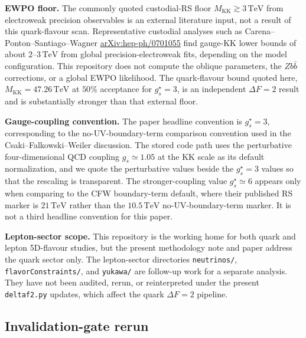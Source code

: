 \documentclass[11pt]{article}
\newcommand{\Mkk}{M_{\mathrm{KK}}}
\newcommand{\gs}{g_s^{\star}}
\begin{document}
\textbf{EWPO floor.}  The commonly quoted custodial-RS floor
$\Mkk \gtrsim 3\,\mathrm{TeV}$ from electroweak precision observables is
an external literature input, not a result of this quark-flavour scan.
Representative custodial analyses such as
Carena--Ponton--Santiago--Wagner
\href{https://arxiv.org/abs/hep-ph/0701055}{arXiv:hep-ph/0701055}
find gauge-KK lower bounds of about $2$--$3\,\mathrm{TeV}$ from global
precision-electroweak fits, depending on the model configuration.  This
repository does not compute the oblique parameters, the $Zb\bar b$
corrections, or a global EWPO likelihood.  The quark-flavour bound quoted
here, $\Mkk=47.26\,\mathrm{TeV}$ at $50\%$ acceptance for $\gs=3$, is an
independent $\Delta F=2$ result and is substantially stronger than that
external floor.

\textbf{Gauge-coupling convention.}  The paper headline convention is
$\gs=3$, corresponding to the no-UV-boundary-term comparison convention
used in the Csaki--Falkowski--Weiler discussion.  The stored code path
uses the perturbative four-dimensional QCD coupling
$g_s\simeq1.05$ at the KK scale as its default normalization, and we quote
the perturbative values beside the $\gs=3$ values so that the rescaling is
transparent.  The stronger-coupling value $\gs\simeq6$ appears only when
comparing to the CFW boundary-term default, where their published RS
marker is $21\,\mathrm{TeV}$ rather than the $10.5\,\mathrm{TeV}$
no-UV-boundary-term marker.  It is not a third headline convention for
this paper.

\textbf{Lepton-sector scope.}  This repository is the working home for
both quark and lepton 5D-flavour studies, but the present methodology note
and paper address the quark sector only.  The lepton-sector directories
\texttt{neutrinos/}, \texttt{flavorConstraints/}, and \texttt{yukawa/}
are follow-up work for a separate analysis.  They have not been audited,
rerun, or reinterpreted under the present \texttt{deltaf2.py} updates,
which affect the quark $\Delta F=2$ pipeline.

\subsection{Invalidation-gate rerun}
\label{app:invalidation-gate-rerun}
\end{document}
